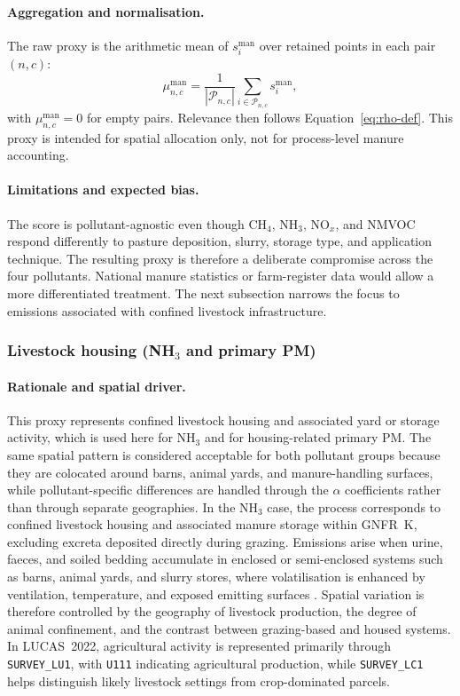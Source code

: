 \paragraph{Aggregation and normalisation.}
The raw proxy is the arithmetic mean of $s_i^{\mathrm{man}}$ over
retained points in each pair $(n,c)$:
\begin{equation}
  \mu_{n,c}^{\mathrm{man}} =
  \frac{1}{|\mathcal{P}_{n,c}|}
  \sum_{i \in \mathcal{P}_{n,c}} s_i^{\mathrm{man}},
\end{equation}
with $\mu_{n,c}^{\mathrm{man}}=0$ for empty pairs. Relevance then
follows Equation~\ref{eq:rho-def}. This proxy is intended for spatial
allocation only, not for process-level manure accounting.

\paragraph{Limitations and expected bias.}
The score is pollutant-agnostic even though CH$_4$, NH$_3$, NO$_x$, and
NMVOC respond differently to pasture deposition, slurry, storage type,
and application technique. The resulting proxy is therefore a
deliberate compromise across the four pollutants. National manure
statistics or farm-register data would allow a more differentiated
treatment. The next subsection narrows the focus to emissions
associated with confined livestock infrastructure.

\subsubsection{Livestock housing (NH$_3$ and primary PM)}
\label{sec:proxy-housing}

\paragraph{Rationale and spatial driver.}
This proxy represents confined livestock housing and associated yard or
storage activity, which is used here for NH$_3$ and for housing-related
primary PM. The same spatial pattern is considered acceptable for both
pollutant groups because they are colocated around barns, animal yards,
and manure-handling surfaces, while pollutant-specific differences are
handled through the $\alpha$ coefficients rather than through separate
geographies. In the NH$_3$ case, the process corresponds to confined
livestock housing and associated manure storage within GNFR~K, excluding
excreta deposited directly during grazing. Emissions arise when urine,
faeces, and soiled bedding accumulate in enclosed or semi-enclosed
systems such as barns, animal yards, and slurry stores, where
volatilisation is enhanced by ventilation, temperature, and exposed
emitting surfaces \citep{EMEP_EEA,wyer_2022}. Spatial variation is
therefore controlled by the geography of livestock production, the
degree of animal confinement, and the contrast between grazing-based and
housed systems. In LUCAS~2022, agricultural activity is represented
primarily through \texttt{SURVEY\_LU1}, with \texttt{U111} indicating
agricultural production, while \texttt{SURVEY\_LC1} helps distinguish
likely livestock settings from crop-dominated parcels.

